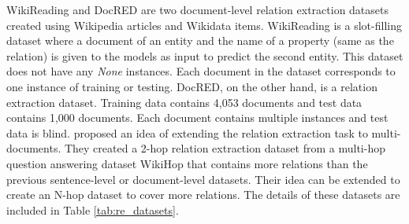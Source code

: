 WikiReading  and DocRED  are two document-level relation extraction datasets created using Wikipedia articles and Wikidata items. WikiReading is a slot-filling dataset where a document of an entity and the name of a property (same as the relation) is given to the models as input to predict the second entity. This dataset does not have any {\em None} instances. Each document in the dataset corresponds to one instance of training or testing. DocRED, on the other hand, is a relation extraction dataset. Training data contains 4,053 documents and test data contains 1,000 documents. Each document contains multiple instances and test data is blind.  proposed an idea of extending the relation extraction task to multi-documents. They created a 2-hop relation extraction dataset from a multi-hop question answering dataset WikiHop  that contains more relations than the previous sentence-level or document-level datasets. Their idea can be extended to create an N-hop dataset to cover more relations. The details of these datasets are included in Table \ref{tab:re_datasets}.

